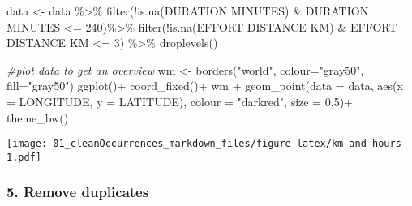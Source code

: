 \documentclass[
]{article}
\newenvironment{Shaded}{\begin{snugshade}}{\end{snugshade}}
\newcommand{\AttributeTok}[1]{\textcolor[rgb]{0.77,0.63,0.00}{#1}}
\newcommand{\CommentTok}[1]{\textcolor[rgb]{0.56,0.35,0.01}{\textit{#1}}}
\newcommand{\DecValTok}[1]{\textcolor[rgb]{0.00,0.00,0.81}{#1}}
\newcommand{\FloatTok}[1]{\textcolor[rgb]{0.00,0.00,0.81}{#1}}
\newcommand{\FunctionTok}[1]{\textcolor[rgb]{0.00,0.00,0.00}{#1}}
\newcommand{\NormalTok}[1]{#1}
\newcommand{\OtherTok}[1]{\textcolor[rgb]{0.56,0.35,0.01}{#1}}
\newcommand{\SpecialCharTok}[1]{\textcolor[rgb]{0.00,0.00,0.00}{#1}}
\newcommand{\StringTok}[1]{\textcolor[rgb]{0.31,0.60,0.02}{#1}}
\begin{document}
\begin{Shaded}
\begin{Highlighting}[]
\NormalTok{data }\OtherTok{\textless{}{-}}\NormalTok{ data }\SpecialCharTok{\%\textgreater{}\%} 
  \FunctionTok{filter}\NormalTok{(}\SpecialCharTok{!}\FunctionTok{is.na}\NormalTok{(}\StringTok{\textasciigrave{}}\AttributeTok{DURATION MINUTES}\StringTok{\textasciigrave{}}\NormalTok{) }\SpecialCharTok{\&} \StringTok{\textasciigrave{}}\AttributeTok{DURATION MINUTES}\StringTok{\textasciigrave{}} \SpecialCharTok{\textless{}=} \DecValTok{240}\NormalTok{)}\SpecialCharTok{\%\textgreater{}\%} 
  \FunctionTok{filter}\NormalTok{(}\SpecialCharTok{!}\FunctionTok{is.na}\NormalTok{(}\StringTok{\textasciigrave{}}\AttributeTok{EFFORT DISTANCE KM}\StringTok{\textasciigrave{}}\NormalTok{) }\SpecialCharTok{\&} \StringTok{\textasciigrave{}}\AttributeTok{EFFORT DISTANCE KM}\StringTok{\textasciigrave{}} \SpecialCharTok{\textless{}=} \DecValTok{3}\NormalTok{) }\SpecialCharTok{\%\textgreater{}\%} 
  \FunctionTok{droplevels}\NormalTok{()}


\CommentTok{\#plot data to get an overview}
\NormalTok{wm }\OtherTok{\textless{}{-}} \FunctionTok{borders}\NormalTok{(}\StringTok{"world"}\NormalTok{, }\AttributeTok{colour=}\StringTok{"gray50"}\NormalTok{, }\AttributeTok{fill=}\StringTok{"gray50"}\NormalTok{)}
\FunctionTok{ggplot}\NormalTok{()}\SpecialCharTok{+} \FunctionTok{coord\_fixed}\NormalTok{()}\SpecialCharTok{+}\NormalTok{ wm }\SpecialCharTok{+}
  \FunctionTok{geom\_point}\NormalTok{(}\AttributeTok{data =}\NormalTok{ data, }\FunctionTok{aes}\NormalTok{(}\AttributeTok{x =}\NormalTok{ LONGITUDE, }\AttributeTok{y =}\NormalTok{ LATITUDE),}
             \AttributeTok{colour =} \StringTok{"darkred"}\NormalTok{, }\AttributeTok{size =} \FloatTok{0.5}\NormalTok{)}\SpecialCharTok{+}
  \FunctionTok{theme\_bw}\NormalTok{()}
\end{Highlighting}
\end{Shaded}

\texttt{[image: 01\_cleanOccurrences\_markdown\_files/figure-latex/km and hours-1.pdf]}

\hypertarget{remove-duplicates}{%
\subsubsection{5. Remove duplicates}\label{remove-duplicates}}
\end{document}
